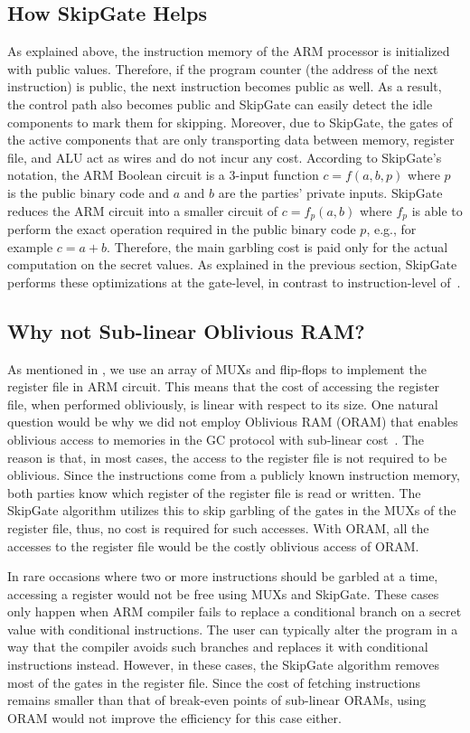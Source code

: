 \subsection{How SkipGate Helps}
As explained above, the instruction memory of the ARM processor is initialized with public values. Therefore, if the program counter (the address of the next instruction) is public, the next instruction becomes public as well.
As a result, the control path also becomes public and SkipGate can easily detect the idle components to mark them for skipping.
Moreover, due to SkipGate, the gates of the active components that are only transporting data between memory, register file, and ALU act as wires and do not incur any cost.
According to SkipGate's notation, the ARM Boolean circuit is a 3-input function $c = f(a,b,p)$ where $p$ is the public binary code and $a$ and $b$ are the parties' private inputs.
SkipGate reduces the ARM circuit into a smaller circuit of $c = f_p(a,b)$ where $f_p$ is able to perform the exact operation required in the public binary code $p$, e.g., for example $c = a + b$.
Therefore, the main garbling cost is paid only for the actual computation on the secret values.
As explained in the previous section, SkipGate performs these optimizations at the gate-level, in contrast to instruction-level of~\cite{wang2016secure, songhori2016garbledcpu}.

\subsection{Why not Sub-linear Oblivious RAM?}
As mentioned in , we use an array of MUXs and flip-flops to implement the register file in ARM circuit.
This means that the cost of accessing the register file, when performed obliviously, is linear with respect to its size.
One natural question would be why we did not employ Oblivious RAM (ORAM) that enables oblivious access to memories in the GC protocol with sub-linear cost~\cite{wang2014scoram, zahur2016revisit}.
The reason is that, in most cases, the access to the register file is not required to be oblivious.
Since the instructions come from a publicly known instruction memory, both parties know which register of the register file is read or written.
The SkipGate algorithm utilizes this to skip garbling of the gates in the MUXs of the register file, thus, no cost is required for such accesses.
With ORAM, all the accesses to the register file would be the costly oblivious access of ORAM.

In rare occasions where two or more instructions should be garbled at a time, accessing a register would not be free using MUXs and SkipGate.
These cases only happen when ARM compiler fails to replace a conditional branch on a secret value with conditional instructions.
The user can typically alter the program in a way that the compiler avoids such branches and replaces it with conditional instructions instead.
However, in these cases, the SkipGate algorithm removes most of the gates in the register file.
Since the cost of fetching instructions remains smaller than that of break-even points of sub-linear ORAMs, using ORAM would not improve the efficiency for this case either.

